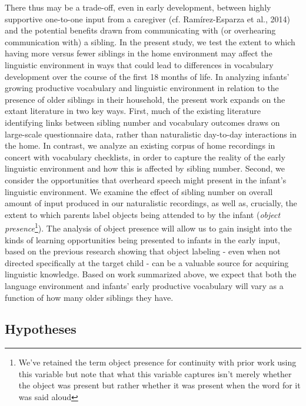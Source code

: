 \documentclass[
  man,mask,floatsintext]{apa6}
\begin{document}
There thus may be a trade-off, even in early development, between highly supportive one-to-one input from a caregiver (cf. Ramírez-Esparza et al., 2014) and the potential benefits drawn from communicating with (or overhearing communication with) a sibling. In the present study, we test the extent to which having more versus fewer siblings in the home environment may affect the linguistic environment in ways that could lead to differences in vocabulary development over the course of the first 18 months of life. In analyzing infants' growing productive vocabulary and linguistic environment in relation to the presence of older siblings in their household, the present work expands on the extant literature in two key ways. First, much of the existing literature identifying links between sibling number and vocabulary outcomes draws on large-scale questionnaire data, rather than naturalistic day-to-day interactions in the home. In contrast, we analyze an existing corpus of home recordings in concert with vocabulary checklists, in order to capture the reality of the early linguistic environment and how this is affected by sibling number. Second, we consider the opportunities that overheard speech might present in the infant's linguistic environment. We examine the effect of sibling number on overall amount of input produced in our naturalistic recordings, as well as, crucially, the extent to which parents label objects being attended to by the infant (\emph{object presence}\footnote{We’ve retained the term object presence for continuity with prior work using this variable but note that what this variable captures isn’t merely whether the object was present but rather whether it was present when the word for it was said aloud}). The analysis of object presence will allow us to gain insight into the kinds of learning opportunities being presented to infants in the early input, based on the previous research showing that object labeling - even when not directed specifically at the target child - can be a valuable source for acquiring linguistic knowledge. Based on work summarized above, we expect that both the language environment and infants' early productive vocabulary will vary as a function of how many older siblings they have.

\hypertarget{hypotheses}{%
\subsection{Hypotheses}\label{hypotheses}}
\end{document}
